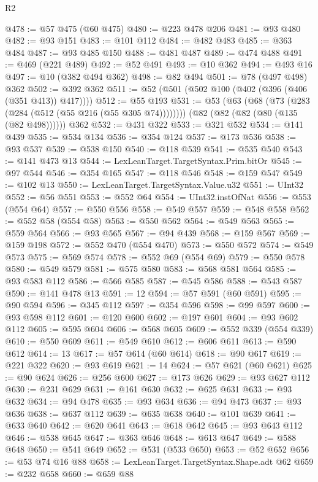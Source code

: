\begin{lexlean}{R2}
\begin{coremodule}
@478 := @57 @475 (@60 @475)
@480 := @223 @478 @206
@481 := @93 @480
@482 := @93 @151
@483 := @101 @112
@484 := @482 @483
@485 := @363 @484
@487 := @93 @485 @150
@488 := @481 @487
@489 := @474 @488
@491 := @469 (@221 @489)
@492 := @52 @491
@493 := @10 @362
@494 := @493 @16
@497 := @10 (@382 @494 @362)
@498 := @82 @494
@501 := @78 (@497 @498) @362
@502 := @392 @362
@511 := @52 (@501 (@502 @100 (@402 (@396 (@406 (@351 @413)) @417))))
@512 := @55 @193
@531 := @53
    (@63 (@68 (@73 (@283 (@284 (@512 (@55 @216 (@55 @305 @74))))))))
    (@82 (@82 (@82 (@80 (@135 (@82 @498))))))
    @362
@532 := @431 @322
@533 := @321 @532
@534 := @141 @439
@535 := @534 @134
@536 := @354 @124
@537 := @173 @536
@538 := @93 @537
@539 := @538 @150
@540 := @118 @539
@541 := @535 @540
@543 := @141 @473 @13
@544 := LexLeanTarget.TargetSyntax.Prim.bitOr
@545 := @97 @544
@546 := @354 @165
@547 := @118 @546
@548 := @159 @547
@549 := @102 @13
@550 := LexLeanTarget.TargetSyntax.Value.u32
@551 := UInt32
@552 := @56 @551
@553 := @552 @64
@554 := UInt32.instOfNat
@556 := @553 (@554 @64)
@557 := @550 @556
@558 := @549 @557
@559 := @548 @558
@562 := @552 @58 (@554 @58)
@563 := @550 @562
@564 := @549 @563
@565 := @559 @564
@566 := @93 @565
@567 := @94 @439
@568 := @159 @567
@569 := @159 @198
@572 := @552 @470 (@554 @470)
@573 := @550 @572
@574 := @549 @573
@575 := @569 @574
@578 := @552 @69 (@554 @69)
@579 := @550 @578
@580 := @549 @579
@581 := @575 @580
@583 := @568 @581 @564
@585 := @93 @583 @112
@586 := @566 @585
@587 := @545 @586
@588 := @543 @587
@590 := @141 @478 @13
@591 := 12
@594 := @57 @591 (@60 @591)
@595 := @90 @594
@596 := @345 @112
@597 := @354 @596
@598 := @99 @597
@600 := @93 @598 @112
@601 := @120 @600
@602 := @197 @601
@604 := @93 @602 @112
@605 := @595 @604
@606 := @568 @605
@609 := @552 @339 (@554 @339)
@610 := @550 @609
@611 := @549 @610
@612 := @606 @611
@613 := @590 @612
@614 := 13
@617 := @57 @614 (@60 @614)
@618 := @90 @617
@619 := @221 @322
@620 := @93 @619
@621 := 14
@624 := @57 @621 (@60 @621)
@625 := @90 @624
@626 := @256 @600
@627 := @173 @626
@629 := @93 @627 @112
@630 := @231 @629
@631 := @161 @630
@632 := @625 @631
@633 := @93 @632
@634 := @94 @478
@635 := @93 @634
@636 := @94 @473
@637 := @93 @636
@638 := @637 @112
@639 := @635 @638
@640 := @101 @639
@641 := @633 @640
@642 := @620 @641
@643 := @618 @642
@645 := @93 @643 @112
@646 := @538 @645
@647 := @363 @646
@648 := @613 @647
@649 := @588 @648
@650 := @541 @649
@652 := @531 (@533 @650)
@653 := @52 @652
@656 := @53 @74 @16 @88
@658 := LexLeanTarget.TargetSyntax.Shape.adt @62
@659 := @232 @658
@660 := @659 @88

\end{coremodule}
\end{lexlean}
